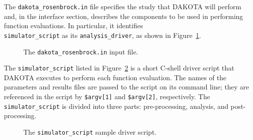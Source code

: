 The \texttt{dakota\_rosenbrock.in} file specifies the study that
DAKOTA will perform and, in the interface section, describes the
components to be used in performing function evaluations. In
particular, it identifies \\ \texttt{simulator\_script} as its
\texttt{analysis\_driver}, as shown in Figure~\ref{advint:figure01}.
\begin{figure}
  \centering
  \begin{bigbox}
    \begin{small}
    \end{small}
  \end{bigbox}
  \caption{The \texttt{dakota\_rosenbrock.in} input file.}
  \label{advint:figure01}
\end{figure}

The \texttt{simulator\_script} listed in Figure~\ref{advint:figure02}
is a short C-shell driver script that DAKOTA executes to perform each
function evaluation. The names of the parameters and results files are
passed to the script on its command line; they are
referenced in the script by \texttt{\$argv[1]}
and \texttt{\$argv[2]}, respectively. The \texttt{simulator\_script}
is divided into three parts: pre-processing, analysis, and post-processing.

\begin{figure}
  \centering
  \begin{bigbox}
    \begin{small}
    \end{small}
  \end{bigbox}
  \caption{The \texttt{simulator\_script} sample driver script.}
  \label{advint:figure02}
\end{figure}


